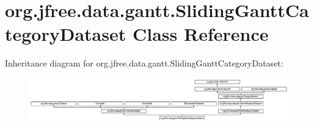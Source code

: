 \hypertarget{classorg_1_1jfree_1_1data_1_1gantt_1_1_sliding_gantt_category_dataset}{}\section{org.\+jfree.\+data.\+gantt.\+Sliding\+Gantt\+Category\+Dataset Class Reference}
\label{classorg_1_1jfree_1_1data_1_1gantt_1_1_sliding_gantt_category_dataset}
Inheritance diagram for org.\+jfree.\+data.\+gantt.\+Sliding\+Gantt\+Category\+Dataset\+:\begin{figure}[H]
\begin{center}
\leavevmode
\includegraphics[height=1.911263cm]{classorg_1_1jfree_1_1data_1_1gantt_1_1_sliding_gantt_category_dataset}
\end{center}
\end{figure}

